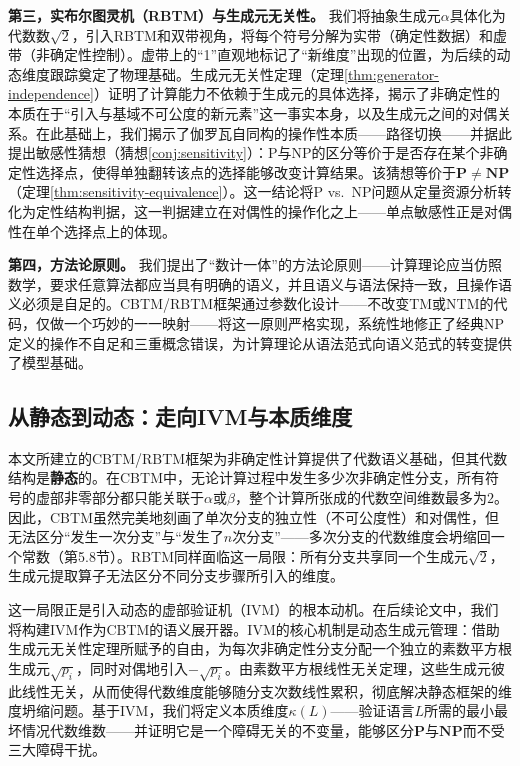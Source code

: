 \documentclass{ctexart}
\begin{document}
	\textbf{第三，实布尔图灵机（RBTM）与生成元无关性。} 我们将抽象生成元$\alpha$具体化为代数数$\sqrt{2}$，引入RBTM和双带视角，将每个符号分解为实带（确定性数据）和虚带（非确定性控制）。虚带上的``1''直观地标记了``新维度''出现的位置，为后续的动态维度跟踪奠定了物理基础。生成元无关性定理（定理\ref{thm:generator-independence}）证明了计算能力不依赖于生成元的具体选择，揭示了非确定性的本质在于``引入与基域不可公度的新元素''这一事实本身，以及生成元之间的对偶关系。在此基础上，我们揭示了伽罗瓦自同构的操作性本质——路径切换——并据此提出敏感性猜想（猜想\ref{conj:sensitivity}）：P与NP的区分等价于是否存在某个非确定性选择点，使得单独翻转该点的选择能够改变计算结果。该猜想等价于$\mathbf{P}\neq\mathbf{NP}$（定理\ref{thm:sensitivity-equivalence}）。这一结论将P vs.\ NP问题从定量资源分析转化为定性结构判据，这一判据建立在对偶性的操作化之上——单点敏感性正是对偶性在单个选择点上的体现。
	
	\textbf{第四，方法论原则。} 我们提出了``数计一体''的方法论原则——计算理论应当仿照数学，要求任意算法都应当具有明确的语义，并且语义与语法保持一致，且操作语义必须是自足的。CBTM/RBTM框架通过参数化设计——不改变TM或NTM的代码，仅做一个巧妙的一一映射——将这一原则严格实现，系统性地修正了经典NP定义的操作不自足和三重概念错误，为计算理论从语法范式向语义范式的转变提供了模型基础。
	
	\subsection{从静态到动态：走向IVM与本质维度}
	
	本文所建立的CBTM/RBTM框架为非确定性计算提供了代数语义基础，但其代数结构是\textbf{静态}的。在CBTM中，无论计算过程中发生多少次非确定性分支，所有符号的虚部非零部分都只能关联于$\alpha$或$\beta$，整个计算所张成的代数空间维数最多为$2$。因此，CBTM虽然完美地刻画了单次分支的独立性（不可公度性）和对偶性，但无法区分``发生一次分支''与``发生了$n$次分支''——多次分支的代数维度会坍缩回一个常数（第5.8节）。RBTM同样面临这一局限：所有分支共享同一个生成元$\sqrt{2}$，生成元提取算子无法区分不同分支步骤所引入的维度。
	
	这一局限正是引入动态的虚部验证机（IVM）的根本动机。在后续论文中，我们将构建IVM作为CBTM的语义展开器。IVM的核心机制是动态生成元管理：借助生成元无关性定理所赋予的自由，为每次非确定性分支分配一个独立的素数平方根生成元$\sqrt{p_i}$，同时对偶地引入$-\sqrt{p_i}$。由素数平方根线性无关定理，这些生成元彼此线性无关，从而使得代数维度能够随分支次数线性累积，彻底解决静态框架的维度坍缩问题。基于IVM，我们将定义本质维度$\kappa(L)$——验证语言$L$所需的最小最坏情况代数维数——并证明它是一个障碍无关的不变量，能够区分$\mathbf{P}$与$\mathbf{NP}$而不受三大障碍干扰。
	
\end{document}

